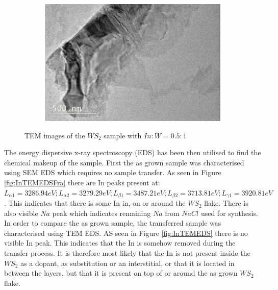\begin{figure}[H]
\begin{center}
		\begin{subfigure}[b]{0.6\textwidth}
			\includegraphics[width=\textwidth]{In/TEMImage3.png}
			\caption{}
			\label{fig:InTEMImage3}
		\end{subfigure}
		\caption{TEM images of the $WS_2$ sample with $In:W = 0.5:1$}
		\label{fig:InTEMImages}
	\end{center}
\end{figure}

The energy dispersive x-ray spectroscopy (EDS) has been then utilised to find the chemical makeup of the sample. First the as grown sample was characterised using SEM EDS which requires no sample transfer. As seen in Figure \ref{fig:InTEMEDSFra} there are In peaks present at: $L_{{\alpha}1} = 3286.94 eV; L_{{\alpha}2} = 3279.29 eV; L_{{\beta}1} = 3487.21 eV; L_{{\beta}2} = 3713.81 eV; L_{{\gamma}1} = 3920.81 eV$. This indicates that there is some In in, on or around the $WS_2$ flake. There is also visible $Na$ peak which indicates remaining $Na$ from $NaCl$ used for synthesis. In order to compare the as grown sample, the transferred sample was characterised using TEM EDS. AS seen in Figure \ref{fig:InTEMEDS} there is no visible In peak. This indicates that the In is somehow removed during the transfer process. It is therefore most likely that the In is not present inside the $WS_2$ as a dopant, as substitution or an interstitial, or that it is located in between the layers, but that it is present on top of or around the as grown $WS_2$ flake.

